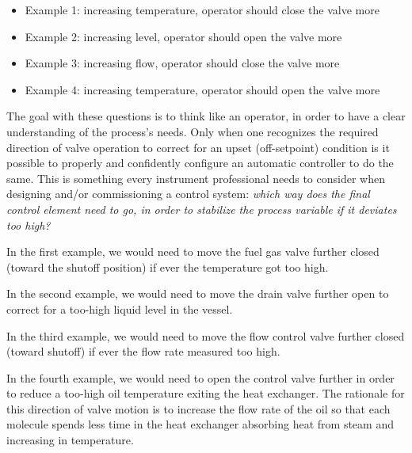 





\begin{itemize}
\item{} Example 1: increasing temperature, operator should close the valve more
\item{} Example 2: increasing level, operator should open the valve more
\item{} Example 3: increasing flow, operator should close the valve more
\item{} Example 4: increasing temperature, operator should open the valve more
\end{itemize}

The goal with these questions is to think like an operator, in order to have a clear understanding of the process's needs.  Only when one recognizes the required direction of valve operation to correct for an upset (off-setpoint) condition is it possible to properly and confidently configure an automatic controller to do the same.  This is something every instrument professional needs to consider when designing and/or commissioning a control system: {\it which way does the final control element need to go, in order to stabilize the process variable if it deviates too high?}

\vskip 10pt

In the first example, we would need to move the fuel gas valve further closed (toward the shutoff position) if ever the temperature got too high.

\vskip 10pt

In the second example, we would need to move the drain valve further open to correct for a too-high liquid level in the vessel.

\vskip 10pt

In the third example, we would need to move the flow control valve further closed (toward shutoff) if ever the flow rate measured too high.

\vskip 10pt

In the fourth example, we would need to open the control valve further in order to reduce a too-high oil temperature exiting the heat exchanger.  The rationale for this direction of valve motion is to increase the flow rate of the oil so that each molecule spends less time in the heat exchanger absorbing heat from steam and increasing in temperature.

